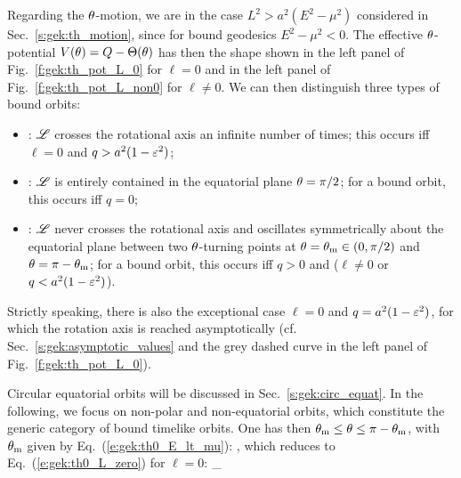 Regarding the $\theta$-motion, we are in the case $L^2 > a^2(E^2 - \mu^2)$
considered in Sec.~\ref{s:gek:th_motion}, since for bound geodesics $E^2 - \mu^2 < 0$.
The effective $\theta$-potential $V(\theta) = Q - \Theta(\theta)$ has then the shape shown in
the left panel of Fig.~\ref{f:gek:th_pot_L_0} for $\ell=0$ and in the left panel
of Fig.~\ref{f:gek:th_pot_L_non0} for $\ell\neq 0$.
We can then distinguish three types of bound orbits:
\begin{itemize}
\item {}: $\mathscr{L}$ crosses the rotational axis an infinite number
of times; this occurs iff $\ell=0$ and $q > a^2 ( 1-\varepsilon^2)$;
\item {}: $\mathscr{L}$ is entirely contained in the
equatorial plane $\theta=\pi/2$; for a bound orbit, this occurs iff $q=0$;
\item {}: $\mathscr{L}$ never crosses the rotational axis and oscillates symmetrically about the equatorial plane between
two $\theta$-turning points at $\theta = \theta_{\rm m} \in (0,\pi /2)$ and $\theta=\pi-\theta_{\rm m}$;
for a bound orbit, this occurs iff $q>0$ and ($\ell\neq 0$ or $q<a^2 ( 1-\varepsilon^2)$).
\end{itemize}
Strictly speaking, there is also the exceptional case $\ell=0$ and
$q = a^2 (1 -\varepsilon^2)$, for which the rotation axis is reached
asymptotically (cf. Sec.~\ref{s:gek:asymptotic_values} and the grey dashed curve
in the left panel of Fig.~\ref{f:gek:th_pot_L_0}).

Circular equatorial orbits will be discussed in Sec.~\ref{s:gek:circ_equat}.
In the following, we focus on non-polar and non-equatorial orbits, which
constitute the generic category of bound timelike orbits.
One has then $\theta_{\rm m} \leq \theta \leq \pi - \theta_{\rm m}$, with $\theta_{\rm m}$ given by
Eq.~(\ref{e:gek:th0_E_lt_mu}):
\be \label{e:gek:th_min_arccos}
     ,
\ee
which reduces to Eq.~(\ref{e:gek:th0_L_zero}) for $\ell = 0$:
\be
   _{\, }
\ee

